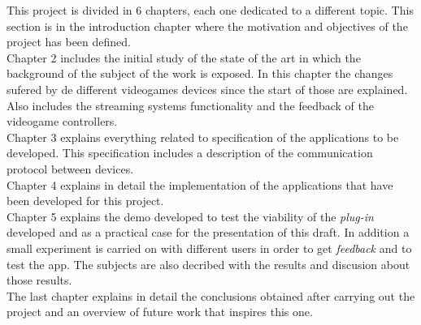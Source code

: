 This project is divided in 6 chapters, each one dedicated to a different topic. This section is in the introduction chapter where the motivation and objectives of the project has been defined.\\

Chapter 2 includes the initial study of the state of the art in which the background of the subject of the work is exposed. In this chapter the changes sufered by de different videogames devices since the start of those are explained. Also includes the streaming systems functionality and the feedback of the videogame controllers.\\

Chapter 3 explains everything related to specification of the applications to be developed. This specification includes a description of the communication protocol between devices. \\

Chapter 4 explains in detail the implementation of the applications that have been developed for this project. \\

Chapter 5 explains the demo developed to test the viability of the \textit{plug-in} developed and as a practical case for the presentation of this draft. In addition a small experiment is carried on with different users in order to get \textit{feedback} and to test the app. The subjects are also decribed with the results and discusion about those results.\\

The last chapter explains in detail the conclusions obtained after carrying out the project and an overview of future work that inspires this one.\\

